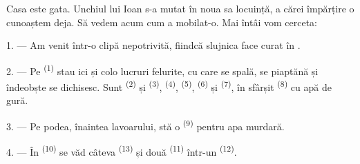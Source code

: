 %
%
%

\VUsaut{6.0mm}
\VUsaut{1.4mm}
\VUsaut{0.4mm}
\VUsaut{2.2mm}

Casa este gata. Unchiul lui Ioan s-a mutat în noua sa locuință, a cărei împărțire
o cunoaștem deja. Să vedem acum cum a mobilat-o. Mai întâi vom cerceta:

\VUsaut{3.0mm}

1. --- Am venit într-o clipă nepotrivită, fiindcă slujnica face curat în
.

2. --- Pe  \textsuperscript{(1)} stau ici și colo lucruri felurite,
cu care se spală, se piaptănă și îndeobște se dichisesc. Sunt 
\textsuperscript{(2)} și  \textsuperscript{(3)},  \textsuperscript{(4)},  \textsuperscript{(5)},
 \textsuperscript{(6)} și 
\textsuperscript{(7)}, în sfârșit  \textsuperscript{(8)} cu apă
de gură.

3. --- Pe podea, înaintea lavoarului, stă o 
\textsuperscript{(9)} pentru apa murdară.

4. --- În  \textsuperscript{(10)} se văd câteva 
\textsuperscript{(13)} și două  \textsuperscript{(11)} într-un
 \textsuperscript{(12)}.

